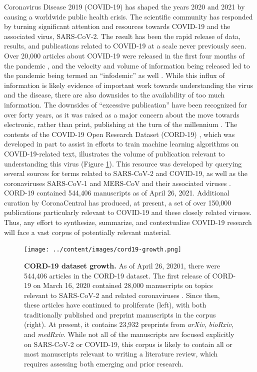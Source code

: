 \documentclass[sigconf]{acmart}
\begin{document}
Coronavirus Disease 2019 (COVID-19) has shaped the years 2020 and 2021 by causing a worldwide public health crisis.
The scientific community has responded by turning significant attention and resources towards COVID-19 and the associated virus, SARS-CoV-2.
The result has been the rapid release of data, results, and publications related to COVID-19 at a scale never previously seen.
Over 20,000 articles about COVID-19 were released in the first four months of the pandemic \citep{7ub6VM4Z}, and the velocity and volume of information being released led to the pandemic being termed an ``infodemic'' as well \citep{7ub6VM4Z, nnfOazAC}.
While this influx of information is likely evidence of important work towards understanding the virus and the disease, there are also downsides to the availability of too much information.
The downsides of ``excessive publication'' have been recognized for over forty years, as it was raised as a major concern about the move towards electronic, rather than print, publishing at the turn of the millennium \citep{DfSr1Ohc}.
The contents of the COVID-19 Open Research Dataset (CORD-19) \citep{CiOwklc6}, which was developed in part to assist in efforts to train machine learning algorithms on COVID-19-related text, illustrates the volume of publication relevant to understanding this virus (Figure \ref{fig:cord19-growth}).
This resource was developed by querying several sources for terms related to SARS-CoV-2 and COVID-19, as well as the coronaviruses SARS-CoV-1 and MERS-CoV and their associated viruses \citep{CiOwklc6}.
CORD-19 contained 544,406 manuscripts as of April 26, 2021.
Additional curation by CoronaCentral \citep{zQ1JIn2J} has produced, at present, a set of over 150,000 publications particularly relevant to COVID-19 and these closely related viruses.
Thus, any effort to synthesize, summarize, and contextualize COVID-19 research will face a vast corpus of potentially relevant material.

\begin{figure}
\hypertarget{fig:cord19-growth}{%
\centering
  \texttt{[image: ../content/images/cord19-growth.png]}
  \caption{\textbf{CORD-19 dataset growth.}
  As of April 26, 20201, there were 544,406 articles in the CORD-19 dataset.
  The first release of CORD-19 on March 16, 2020 contained 28,000 manuscripts on topics relevant to SARS-CoV-2 and related coronaviruses \cite{CiOwklc6}.
  Since then, these articles have continued to proliferate (left), with both traditionally published and preprint manuscripts in the corpus (right).
  At present, it contains 23,932 preprints from \textit{arXiv}, \textit{bioRxiv}, and \textit{medRxiv}.
  While not all of the manuscripts are focused explicitly on SARS-CoV-2 or COVID-19, this corpus is likely to contain all or most manuscripts relevant to writing a literature review, which requires assessing both emerging and prior research.
  }
  \label{fig:cord19-growth}
}
\end{figure}
\end{document}
